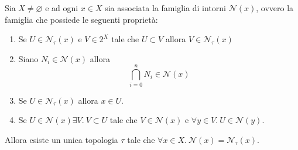 \begin{proposition}
	Sia $X \neq \varnothing$ e ad ogni $x \in X$ sia associata la famiglia di intorni $\mathcal{N}(x)$, ovvero la famiglia che possiede le seguenti proprietà:
	\begin{enumerate}
		\item Se $U \in \mathcal{N}_\tau(x)$ e $V \in 2^X$ tale che $U \subset V$ allora $V \in \mathcal{N}_\tau(x)$
		\item Siano $N_i \in \mathcal{N}(x)$ allora 
			\begin{equation*}
				\bigcap^{n}_{i=0} N_i \in \mathcal{N}(x)
			\end{equation*}
		\item Se $U \in \mathcal{N}_\tau(x)$ allora $x \in U$. 
		\item Se $U \in \mathcal{N}(x) \exists V .\ V \subset U$ 
			tale che $V \in \mathcal{N}(x)$ e $\forall y \in V.\ U \in \mathcal{N}(y)$.
	\end{enumerate}
	Allora esiste un unica topologia $\tau$ tale che $\forall x \in X .\ \mathcal{N}(x) = \mathcal{N}_\tau(x)$.
\end{proposition}

